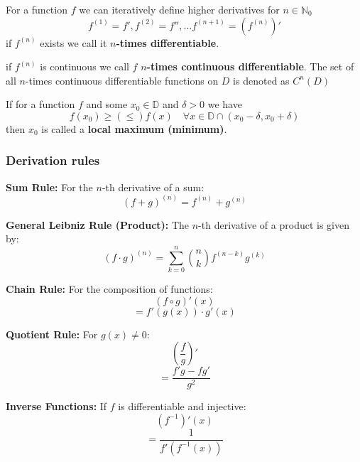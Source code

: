 \begin{definition}
    For a function $f$ we can iteratively define higher derivatives for $n \in \mathbb{N}_0$
    $$f^{(1)} = f', f^{(2)} = f'', \dots f^{(n+1)} = (f^{(n)})'$$
    if $f^{(n)}$ exists we call it $n$\textbf{-times differentiable}.
\end{definition}

\begin{definition}
    if $f^{(n)}$ is continuous we call $f$ $n$\textbf{-times continuous differentiable}. The set of all $n$-times continuous differentiable functions on $D$ is denoted as $C^n(D)$
\end{definition}

\begin{definition}
    If for a function $f$ and some $x_0 \in \mathbb{D}$ and $\delta \gt 0$ we have
    $$f(x_0) \geq (\leq) f(x) \quad \forall x \in \mathbb{D} \cap (x_0 - \delta, x_0 + \delta)$$
    then $x_0$ is called a \textbf{local maximum (minimum)}.
\end{definition}

\subsubsection{Derivation rules}

\begin{theorem}
    \textbf{Sum Rule:} For the $n$-th derivative of a sum:
    $$(f + g)^{(n)} = f^{(n)} + g^{(n)}$$
\end{theorem}

\begin{theorem}
    \textbf{General Leibniz Rule (Product):} The $n$-th derivative of a product is given by:
    $$(f \cdot g)^{(n)} = \sum_{k=0}^{n} \binom{n}{k} f^{(n-k)} g^{(k)}$$
\end{theorem}

\begin{theorem}
    \textbf{Chain Rule:} For the composition of functions:
    $$(f \circ g)'(x)$$
    $$= f'(g(x)) \cdot g'(x)$$
\end{theorem}

\begin{theorem}
    \textbf{Quotient Rule:} For $g(x) \neq 0$:
    $$\left(\frac{f}{g}\right)'$$
    $$= \frac{f'g - fg'}{g^2}$$
\end{theorem}

\begin{theorem}
    \textbf{Inverse Functions:} If $f$ is differentiable and injective:
    $$(f^{-1})'(x)$$
    $$= \frac{1}{f'(f^{-1}(x))}$$
\end{theorem}

